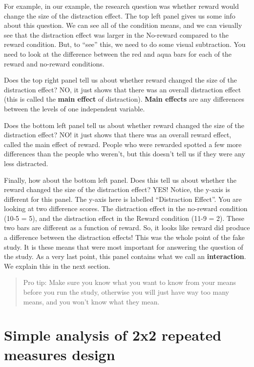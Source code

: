 \documentclass[
]{book}
\begin{document}
For example, in our example, the research question was whether reward would change the size of the distraction effect. The top left panel gives us some info about this question. We can see all of the condition means, and we can visually see that the distraction effect was larger in the No-reward compared to the reward condition. But, to ``see'' this, we need to do some visual subtraction. You need to look at the difference between the red and aqua bars for each of the reward and no-reward conditions.

Does the top right panel tell us about whether reward changed the size of the distraction effect? NO, it just shows that there was an overall distraction effect (this is called the \textbf{main effect} of distraction). \textbf{Main effects} are any differences between the levels of one independent variable.

Does the bottom left panel tell us about whether reward changed the size of the distraction effect? NO! it just shows that there was an overall reward effect, called the main effect of reward. People who were rewarded spotted a few more differences than the people who weren't, but this doesn't tell us if they were any less distracted.

Finally, how about the bottom left panel. Does this tell us about whether the reward changed the size of the distraction effect? YES! Notice, the y-axis is different for this panel. The y-axis here is labelled ``Distraction Effect''. You are looking at two difference scores. The distraction effect in the no-reward condition (10-5 = 5), and the distraction effect in the Reward condition (11-9 = 2). These two bars are different as a function of reward. So, it looks like reward did produce a difference between the distraction effects! This was the whole point of the fake study. It is these means that were most important for answering the question of the study. As a very last point, this panel contains what we call an \textbf{interaction}. We explain this in the next section.

\begin{quote}
Pro tip: Make sure you know what you want to know from your means before you run the study, otherwise you will just have way too many means, and you won't know what they mean.
\end{quote}

\hypertarget{simple-analysis-of-2x2-repeated-measures-design}{%
\section{Simple analysis of 2x2 repeated measures design}\label{simple-analysis-of-2x2-repeated-measures-design}}
\end{document}
